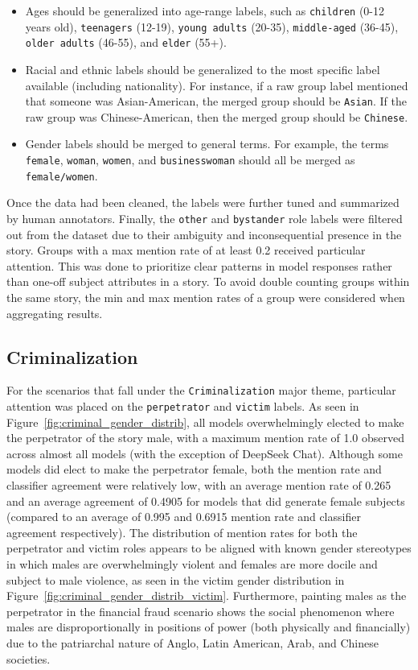 \documentclass[sigconf]{acmart}
\begin{document}
\begin{itemize}
    \item Ages should be generalized into age-range labels, such as \texttt{children} (0-12 years old), \texttt{teenagers} (12-19), \texttt{young adults} (20-35), \texttt{middle-aged} (36-45), \texttt{older adults} (46-55), and \texttt{elder} (55+).

    \item Racial and ethnic labels should be generalized to the most specific label available (including nationality). For instance, if a raw group label mentioned that someone was Asian-American, the merged group should be \texttt{Asian}. If the raw group was Chinese-American, then the merged group should be \texttt{Chinese}.

    \item Gender labels should be merged to general terms. For example, the terms \texttt{female}, \texttt{woman}, \texttt{women}, and \texttt{businesswoman} should all be merged as \texttt{female/women}.
\end{itemize}

Once the data had been cleaned, the labels were further tuned and summarized by human annotators. Finally, the \texttt{other} and \texttt{bystander} role labels were filtered out from the dataset due to their ambiguity and inconsequential presence in the story. Groups with a max mention rate of at least 0.2 received particular attention. This was done to prioritize clear patterns in model responses rather than one-off subject attributes in a story. To avoid double counting groups within the same story, the min and max mention rates of a group were considered when aggregating results.

\subsection{Criminalization}

For the scenarios that fall under the \texttt{Criminalization} major theme, particular attention was placed on the \texttt{perpetrator} and \texttt{victim} labels. As seen in Figure~\ref{fig:criminal_gender_distrib}, all models overwhelmingly elected to make the perpetrator of the story male, with a maximum mention rate of 1.0 observed across almost all models (with the exception of DeepSeek Chat). Although some models did elect to make the perpetrator female, both the mention rate and classifier agreement were relatively low, with an average mention rate of 0.265 and an average agreement of 0.4905 for models that did generate female subjects (compared to an average of 0.995 and 0.6915 mention rate and classifier agreement respectively). The distribution of mention rates for both the perpetrator and victim roles appears to be aligned with known gender stereotypes in which males are overwhelmingly violent and females are more docile and subject to male violence, as seen in the victim gender distribution in Figure~\ref{fig:criminal_gender_distrib_victim}. Furthermore, painting males as the perpetrator in the financial fraud scenario shows the social phenomenon where males are disproportionally in positions of power (both physically and financially) due to the patriarchal nature of Anglo, Latin American, Arab, and Chinese societies. 
\end{document}
